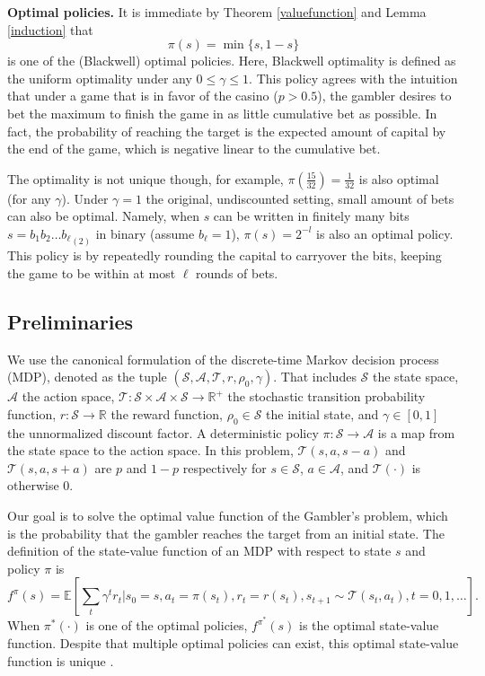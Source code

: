 \documentclass{article}
\theoremstyle{named}
\newcommand{\E}[1]{\mathbb{E}\left[#1\right]}
\begin{document}
\textbf{Optimal policies.} It is immediate by Theorem \ref{valuefunction} and Lemma \ref{induction} that
\[\pi(s)=\min\{s,1-s\}\]
is one of the (Blackwell) optimal policies. Here, Blackwell optimality is defined as the uniform optimality under any $0\leq\gamma\leq 1$. This policy agrees with the intuition that under a game that is in favor of the casino ($p>0.5$), the gambler desires to bet the maximum to finish the game in as little cumulative bet as possible. In fact, the probability of reaching the target is the expected amount of capital by the end of the game, which is negative linear to the cumulative bet. 

The optimality is not unique though, for example, $\pi(\frac{15}{32})=\frac{1}{32}$ is also optimal (for any $\gamma$). Under $\gamma=1$ the original, undiscounted setting, small amount of bets can also be optimal. Namely, when $s$ can be written in finitely many bits $s={b_1b_2\dots b_\ell}_{(2)}$ in binary (assume $b_\ell=1$), $\pi(s)=2^{-l}$ is also an optimal policy. This policy is by repeatedly rounding the capital to carryover the bits, keeping the game to be within at most $\ell$ rounds of bets.

\subsection{Preliminaries}
\label{sec:prelim}

We use the canonical formulation of the discrete-time Markov decision process (MDP), denoted as the tuple $(\mathcal{S},\mathcal{A}, \mathcal{T}, r,\rho_0,\gamma)$. That includes $\mathcal{S}$ the state space, $\mathcal{A}$ the action space, $\mathcal{T}:\mathcal{S}\times\mathcal{A}\times\mathcal{S} \to \mathbb{R}^+$ the stochastic transition probability function, $r:\mathcal{S}\to\mathbb{R}$ the reward function, $\rho_0\in \mathcal{S}$ the initial state, and $\gamma \in [0,1]$ the unnormalized discount factor. 
A deterministic policy $\pi:\mathcal{S}\to\mathcal{A}$ is a map from the state space to the action space. In this problem, $\mathcal{T}(s,a,s-a)$ and $\mathcal{T}(s,a,s+a)$ are $p$ and $1-p$ respectively for $s\in\mathcal{S}$, $a\in \mathcal{A}$, and $\mathcal{T}(\cdot)$ is otherwise $0$.

Our goal is to solve the optimal value function of the Gambler's problem, which is the probability that the gambler reaches the target from an initial state. 
The definition of the state-value function of an MDP with respect to state $s$ and policy $\pi$ is
\[
f^\pi(s) = \E{\sum_{t} \gamma^t r_t \Big| s_0=s, a_t=\pi(s_t), r_t= r(s_t), s_{t+1}\sim \mathcal{T}(s_t,a_t), t=0,1,\dots} .
\]
When $\pi^\ast(\cdot)$ is one of the optimal policies, $f^{\pi^\ast}(s)$ is the optimal state-value function. Despite that multiple optimal policies can exist, this optimal state-value function is unique \citep{sutton2018reinforcement,szepesvari2010algorithms}.
\end{document}
